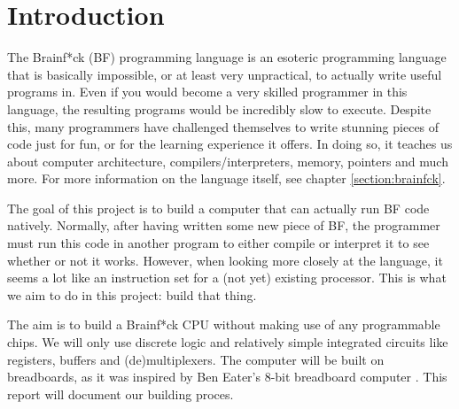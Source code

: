 \section{Introduction}
The Brainf*ck (BF) programming language is an esoteric programming language that is basically impossible, or at least very unpractical, to actually write useful programs in. Even if you would become a very skilled programmer in this language, the resulting programs would be incredibly slow to execute. Despite this, many programmers have challenged themselves to write stunning pieces of code just for fun, or for the learning experience it offers. In doing so, it teaches us about computer architecture, compilers/interpreters, memory, pointers and much more. For more information on the language itself, see chapter \ref{section:brainfck}.

The goal of this project is to build a computer that can actually run BF code natively. Normally, after having written some new piece of BF, the programmer must run this code in another program to either compile or interpret it to see whether or not it works. However, when looking more closely at the language, it seems a lot like an instruction set for a (not yet) existing processor. This is what we aim to do in this project: build that thing.

The aim is to build a Brainf*ck CPU without making use of any programmable chips. We will only use discrete logic and relatively simple integrated circuits like registers, buffers and (de)multiplexers. The computer will be built on breadboards, as it was inspired by Ben Eater's 8-bit breadboard computer \cite{beneater}. This report will document our building proces.
